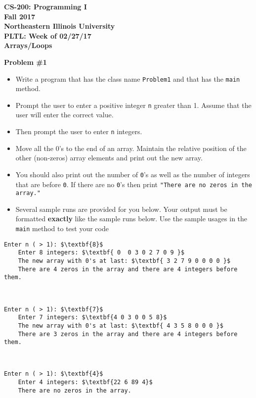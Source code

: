 \documentclass[12pt]{article}
\begin{document}
\begin{center}
	\textbf{CS-200: Programming I}\\
	\textbf{Fall 2017}\\
	\textbf{Northeastern Illinois University}\\
	\textbf{PLTL: Week of 02/27/17}\\
	\textbf{Arrays/Loops}
\end{center}

\noindent\textbf{Problem \#1}
\begin{itemize}
	\item Write a program that has the class name \texttt{Problem1} and that has the \texttt{main} method.
	\item Prompt the user to enter a positive integer \texttt{n} greater than 1. Assume that the user will enter the correct value. 
	\item Then prompt the user to enter \texttt{n} integers.
	\item Move all the 0's to the end of an array. Maintain the relative position of the other (non-zeros) array elements and print out the new array. 
	\item You should also print out the number of \texttt{0}'s as well as the number of integers that are before \texttt{0}. If there are no \texttt{0}'s then print \texttt{"There are no zeros in the array."}
	\item Several sample runs are provided for you below. Your output must be formatted \textbf{exactly} like the sample runs below. Use the sample usages in the \texttt{main} method to test your code 
\end{itemize}
\begin{center}
\begin{minipage}{12cm}
	\begin{lstlisting}[escapechar=$]
	Enter n ( > 1): $\textbf{8}$
	Enter 8 integers: $\textbf{ 0  0 3 0 2 7 0 9 }$
	The new array with 0's at last: $\textbf{ 3 2 7 9 0 0 0 0 }$
	There are 4 zeros in the array and there are 4 integers before them.
	\end{lstlisting}
\end{minipage}\\
\begin{minipage}{12cm}
	\begin{lstlisting}[escapechar=$]
	Enter n ( > 1): $\textbf{7}$
	Enter 7 integers: $\textbf{4 0 3 0 0 5 8}$
	The new array with 0's at last: $\textbf{ 4 3 5 8 0 0 0 }$
	There are 3 zeros in the array and there are 4 integers before them. 
	\end{lstlisting}
\end{minipage}\\
\begin{minipage}{6cm}
	\begin{lstlisting}[escapechar=$]
	Enter n ( > 1): $\textbf{4}$
	Enter 4 integers: $\textbf{22 6 89 4}$
	There are no zeros in the array.
	\end{lstlisting}
\end{minipage}

\end{center}
\end{document}
